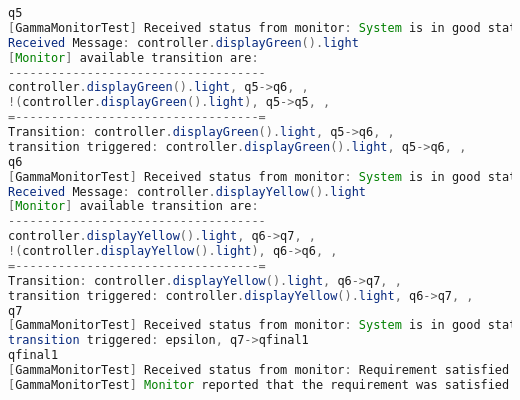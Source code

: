 \begin{lstlisting}[language=java, caption={Szenárió szöveges leírása.},captionpos=b]
q5
[GammaMonitorTest] Received status from monitor: System is in good state.
Received Message: controller.displayGreen().light
[Monitor] available transition are:
------------------------------------
controller.displayGreen().light, q5->q6, ,
!(controller.displayGreen().light), q5->q5, ,
=----------------------------------=
Transition: controller.displayGreen().light, q5->q6, ,
transition triggered: controller.displayGreen().light, q5->q6, ,
q6
[GammaMonitorTest] Received status from monitor: System is in good state.
Received Message: controller.displayYellow().light
[Monitor] available transition are:
------------------------------------
controller.displayYellow().light, q6->q7, ,
!(controller.displayYellow().light), q6->q6, ,
=----------------------------------=
Transition: controller.displayYellow().light, q6->q7, ,
transition triggered: controller.displayYellow().light, q6->q7, ,
q7
[GammaMonitorTest] Received status from monitor: System is in good state.
transition triggered: epsilon, q7->qfinal1
qfinal1
[GammaMonitorTest] Received status from monitor: Requirement satisfied
[GammaMonitorTest] Monitor reported that the requirement was satisfied    
\end{lstlisting}